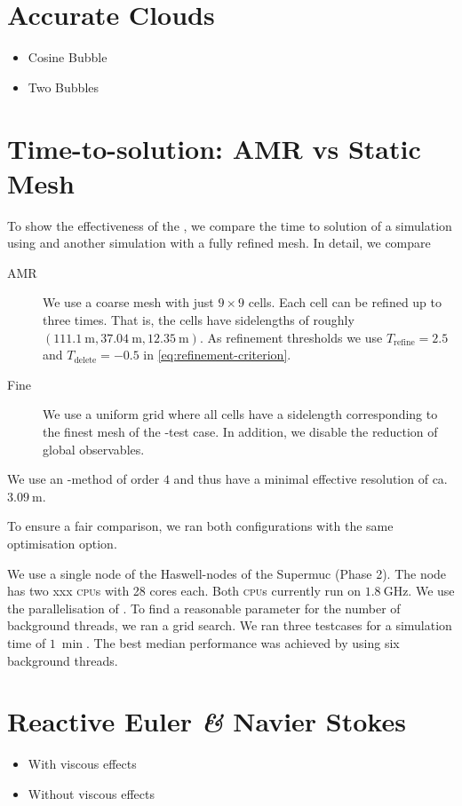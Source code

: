 \section{Accurate Clouds}
\begin{itemize}
\item Cosine Bubble
\item Two Bubbles
\end{itemize}
\section{Time-to-solution: AMR vs Static Mesh}
To show the effectiveness of the \amr{}, we compare the time to solution of a simulation using \amr{} and another simulation with a fully refined mesh.
In detail, we compare
\begin{description}
\item[AMR] We use a coarse mesh with just $9 \times 9$ cells.
  Each cell can be refined up to three times.
  That is, the cells have sidelengths of roughly $\left( \SI{111.1}{\m}, \SI{37.04}{\m}, \SI{12.35}{\m} \right)$.
  As refinement thresholds we use $T_\text{refine} = 2.5$ and $T_\text{delete} = -0.5$ in \cref{eq:refinement-criterion}.
\item[Fine] We use a uniform grid where all cells have a sidelength corresponding to the finest mesh of the \amr{}-test case.
  In addition, we disable the reduction of global observables.
\end{description}
We use an \aderdg{}-method of order $4$ and thus have a minimal effective resolution of ca.\ $\SI{3.09}{\m}$.

To ensure a fair comparison, we ran both configurations with the same optimisation option.

We use a single node of the Haswell-nodes of the Supermuc (Phase 2).
The node has two xxx \textsc{cpu}s with 28 cores each.
Both \textsc{cpu}s currently run on $\SI{1.8}{\GHz}$.
We use the \tbb{} parallelisation of \exahype{}.
To find a reasonable parameter for the number of background threads, we ran a grid search.
We ran three \amr{} testcases for a simulation time of $\SI{1}{\min}$.
The best median performance was achieved by using six background threads.

\section{Reactive Euler \textit{\&} Navier Stokes}
\begin{itemize}
\item With viscous effects
\item Without viscous effects  
\end{itemize}
